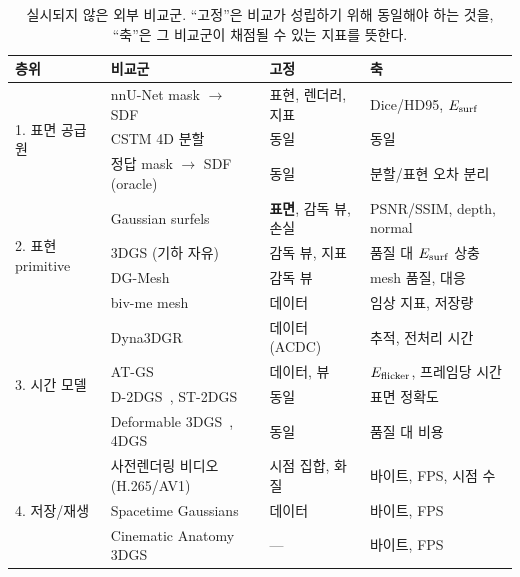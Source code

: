 \begin{table}[htbp]
\centering\small
\caption{실시되지 않은 외부 비교군. ``고정''은 비교가 성립하기 위해 동일해야 하는
것을, ``축''은 그 비교군이 채점될 수 있는 지표를 뜻한다.}
\label{tab:external-baselines}
\begin{tabular}{@{}llp{3.4cm}p{2.9cm}@{}}
\toprule
층위 & 비교군 & 고정 & 축 \\
\midrule
\multirow{3}{*}{1. 표면 공급원}
 & nnU-Net mask $\to$ SDF~\citep{isensee2021_nnunet} & 표현, 렌더러, 지표 & Dice/HD95, $E_{\mathrm{surf}}$ \\
 & CSTM 4D 분할~\citep{ye2025_cstm}     & 동일 & 동일 \\
 & 정답 mask $\to$ SDF (oracle)         & 동일 & 분할/표현 오차 분리 \\
\midrule
\multirow{4}{*}{2. 표현 primitive}
 & Gaussian surfels~\citep{dai2024_gaussian_surfels} & \textbf{표면}, 감독 뷰, 손실 & PSNR/SSIM, depth, normal \\
 & 3DGS (기하 자유)~\citep{kerbl2023_3dgs}           & 감독 뷰, 지표 & 품질 대 $E_{\mathrm{surf}}$ 상충 \\
 & DG-Mesh~\citep{liu2024_dgmesh}                    & 감독 뷰 & mesh 품질, 대응 \\
 & biv-me mesh~\citep{dillon2026_bivme}              & 데이터 & 임상 지표, 저장량 \\
\midrule
\multirow{4}{*}{3. 시간 모델}
 & Dyna3DGR~\citep{fu2025_dyna3dgr}   & 데이터(ACDC) & 추적, 전처리 시간 \\
 & AT-GS~\citep{chen2025_atgs}        & 데이터, 뷰   & $E_{\mathrm{flicker}}$, 프레임당 시간 \\
 & D-2DGS~\citep{zhang2025_d2dgs}, ST-2DGS~\citep{wang2024_st2dgs} & 동일 & 표면 정확도 \\
 & Deformable 3DGS~\citep{yang2023_deformable3dgs}, 4DGS~\citep{wu2024_4dgs} & 동일 & 품질 대 비용 \\
\midrule
\multirow{3}{*}{4. 저장/재생}
 & 사전렌더링 비디오 (H.265/AV1) & 시점 집합, 화질 & 바이트, FPS, 시점 수 \\
 & Spacetime Gaussians~\citep{li2024_stg} & 데이터 & 바이트, FPS \\
 & Cinematic Anatomy 3DGS~\citep{niedermayr2024_cinematic} & --- & 바이트, FPS \\
\bottomrule
\end{tabular}
\end{table}


